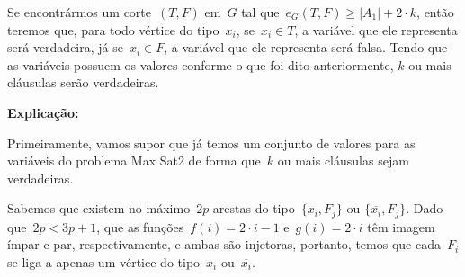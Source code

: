 \documentclass[a4paper,12pt]{article}
\begin{document}
\begin{center}
 \end{center}

		\bigskip
		\bigskip

		Se encontrármos um corte~$(T,F)$ em~$G$ tal 
		que~$e_G(T, F)\ge |A_1| + 2\cdot k$, 
		então teremos que, para todo vértice do tipo~$x_i$,
		se~$x_i\in T$, a variável que ele representa será
		verdadeira, já se~$x_i\in F$, a variável que ele representa
		será falsa. Tendo que as variáveis possuem os valores conforme
		o que foi dito anteriormente, $k$ ou mais cláusulas serão 
		verdadeiras.

		\bigskip
		\bigskip

		\textbf{Explicação:}

		Primeiramente, vamos supor que já temos um conjunto de valores
		para as variáveis do problema Max Sat2 de forma que~$k$ ou mais
		cláusulas sejam verdadeiras.

		Sabemos que existem no máximo~$2p$ arestas do 
		tipo~$\{x_i,F_j\}$ ou $\{\overline{x_i},F_j\}$. Dado 
		que~$2p<3p+1$,
		que as funções~$f(i)=2\cdot i - 1$ e~$g(i)=2\cdot i$ têm imagem 
		ímpar e par, respectivamente, e ambas são injetoras, portanto, 
		temos que cada~$F_i$ se liga a apenas um vértice
		do tipo~$x_i$ ou~$\overline{x_i}$.
\end{document}
